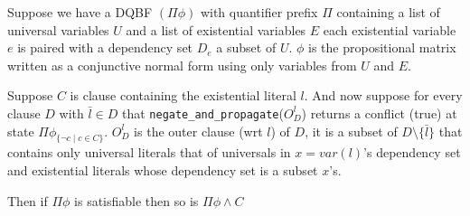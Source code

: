 \documentclass[runningheads]{llncs}
\begin{document}
	\begin{theorem}[DQRATE]
		Suppose we have a DQBF $(\Pi \phi)$ with quantifier prefix $\Pi$ containing a list of universal variables $U$ and a list of existential variables $E$ each existential variable $e$ is paired with a dependency set $D_e$ a subset of $U$. $\phi$ is the propositional matrix written as a conjunctive normal form using only variables from $U$ and $E$.
		
		Suppose $C$ is clause containing the existential literal $l$. And now suppose for every clause $D$ with $\bar l \in D$ that \texttt{negate\_and\_propagate}($O^l_D$) returns a conflict (true) at state $\Pi \phi_{\{\neg c \mid c \in C\}}$. $O^l_D$ is the outer clause (wrt $l$) of $D$, it is a subset of $D\setminus\{\bar l\}$ that contains only universal literals that of universals in $x=var(l)$'s dependency set and existential literals whose dependency set is a subset $x$'s.
		
		Then if $\Pi \phi$ is satisfiable then so is $\Pi \phi\wedge C$
	\end{theorem}
	
\end{document}
